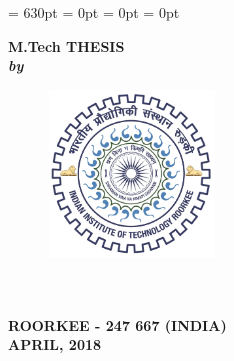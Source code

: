 \begin{titlepage}
\renewcommand{\baselinestretch}{1.5}
  \setlength{\parindent}{0pt}
\textheight = 630pt \topmargin=0pt \voffset=1cm \headheight = 0pt
\marginparwidth= 0pt \headsep = 0pt
\pagestyle{empty}

\begin{center}
\renewcommand{\baselinestretch}{1.2}
\thispagestyle{empty}
\vspace{-10pt}

{\Large \bfseries {\ttitle}\par}\vspace{0.4cm} %

\begingroup
    \fontsize{12pt}{12pt} \selectfont
    \bfseries
\vspace{2.5cm}
\textbf{M.Tech THESIS}\\\vspace{1.5cm}
{\normalsize\textbf{\textit{by}}}\\\vspace{1.5cm}
{\normalsize\textbf{\authorname}}
\endgroup

\vspace{3.5cm}
\begin{figure}[h]
  \centering
\includegraphics[width=1.75in, height=1.75in]{formalities/logo.jpg}
\end{figure}
\renewcommand{\baselinestretch}{1.2}
\vspace{2.5cm}
\begingroup
    \fontsize{14pt}{12pt} \selectfont
    \bfseries
\deptname\\
\univname\\
ROORKEE - 247 667 (INDIA)\\
APRIL, 2018  
\endgroup
\end{center}

\end{titlepage}